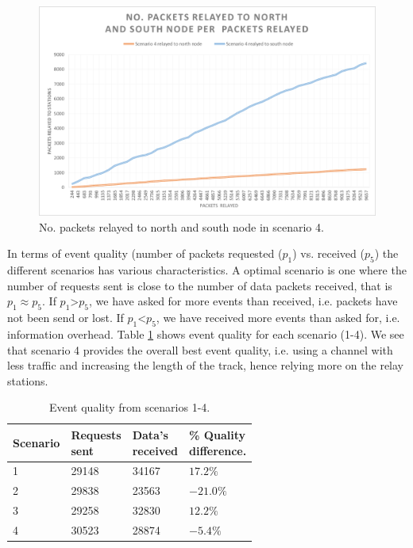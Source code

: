 \begin{figure}[H]
	\centering
	\includegraphics[width=1\linewidth]{results/NoPacketsRelayedScenario4}
	\caption{No. packets relayed to north and south node in scenario 4.}
	\label{fig:nopacketsrelayedscenario4}
\end{figure}

\noindent In terms of event quality (number of packets requested ($p_1$) vs. received ($p_5$) the different scenarios has various characteristics. A optimal scenario is one where the number of requests sent is close to the number of data packets received, that is $p_1 \approx p_5$. If $p_1$>$p_5$, we have asked for more events than received, i.e. packets have not been send or lost. If $p_1$<$p_5$, we have received more events than asked for, i.e. information overhead. Table \ref{table:eventquality} shows event quality for each scenario (1-4). We see that scenario 4 provides the overall best event quality, i.e. using a channel with less traffic and increasing the length of the track, hence relying more on the relay stations.

\begin{table}[h]
	\centering
	\begin{tabular}{|l|l|l|l|} \hline
		Scenario & \pbox{4cm}{Requests \\ sent} & \pbox{18cm}{Data's \\ received} & \pbox{18cm}{\% Quality \\ difference.} \\ \hline
		1 & 29148 & 34167 & $17.2\%$ \\ \hline
		2 & 29838 & 23563 & $-21.0\%$ \\ \hline
		3 & 29258 & 32830 & $12.2\%$ \\ \hline
		4 & 30523 & 28874 & $-5.4\%$ \\ \hline
	\end{tabular}
	\caption{Event quality from scenarios 1-4.}
	\label{table:eventquality}
\end{table}

